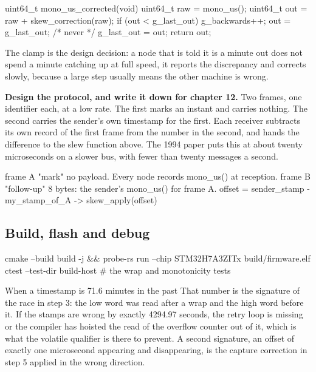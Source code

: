 \begin{steps}
\begin{ccode}
uint64_t mono_us_corrected(void)
{
    uint64_t raw = mono_us();
    uint64_t out = raw + skew_correction(raw);
    if (out < g_last_out) { g_backwards++; out = g_last_out; }  /* never */
    g_last_out = out;
    return out;
}
\end{ccode}
The clamp is the design decision: a node that is told it is a minute out does
not spend a minute catching up at full speed, it reports the discrepancy and
corrects slowly, because a large step usually means the other machine is wrong.

\item \textbf{Design the protocol, and write it down for chapter 12.} Two
frames, one identifier each, at a low rate. The first marks an instant and
carries nothing. The second carries the sender's own timestamp for the first.
Each receiver subtracts its own record of the first frame from the number in the
second, and hands the difference to the slew function above. The 1994 paper puts
this at about twenty microseconds on a slower bus, with fewer than twenty
messages a second.
\begin{plaincode}
frame A  "mark"      no payload. Every node records mono_us() at reception.
frame B  "follow-up" 8 bytes: the sender's mono_us() for frame A.
         offset = sender_stamp - my_stamp_of_A  ->  skew_apply(offset)
\end{plaincode}
\end{steps}

\subsection*{Build, flash and debug}


\begin{shellcode}
cmake --build build -j && probe-rs run --chip STM32H7A3ZITx build/firmware.elf
ctest --test-dir build-host           # the wrap and monotonicity tests
\end{shellcode}

\begin{note}{When a timestamp is 71.6 minutes in the past}
That number is the signature of the race in step 3: the low word was read after
a wrap and the high word before it. If the stamps are wrong by exactly 4294.97
seconds, the retry loop is missing or the compiler has hoisted the read of the
overflow counter out of it, which is what the volatile qualifier is there to
prevent. A second signature, an offset of exactly one microsecond appearing and
disappearing, is the capture correction in step 5 applied in the wrong
direction.
\end{note}

